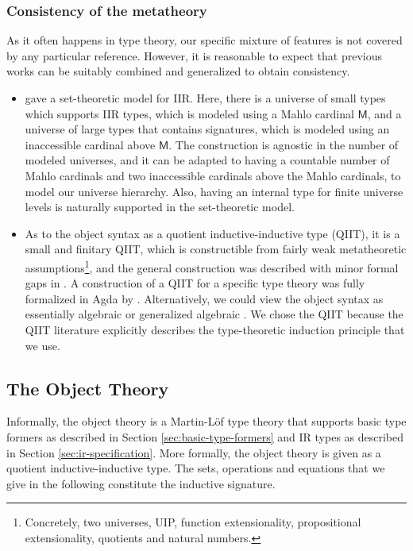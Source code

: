\documentclass[acmsmall,screen,review,anonymous]{acmart}
\newcommand{\msf}[1]{{\mathsf{#1}}}
\begin{document}
\subsubsection{Consistency of the metatheory} As it often happens in type theory, our specific mixture
of features is not covered by any particular reference. However, it is reasonable to expect that
previous works can be suitably combined and generalized to obtain consistency.
\begin{itemize}
\item \citet{DBLP:journals/jlp/DybjerS06} gave a set-theoretic model for IIR. Here, there is a universe of
  small types which supports IIR types, which is modeled using a Mahlo cardinal $\msf{M}$, and a universe of
  large types that contains signatures, which is modeled using an inaccessible cardinal above
  $\msf{M}$. The construction is agnostic in the number of modeled universes, and it can be adapted to
  having a countable number of Mahlo cardinals and two inaccessible cardinals above the Mahlo
  cardinals, to model our universe hierarchy. Also, having an internal type for finite universe
  levels is naturally supported in the set-theoretic model.
\item As to the object syntax as a quotient inductive-inductive type (QIIT), it is a small and
  finitary QIIT, which is constructible from fairly weak metatheoretic
  assumptions\footnote{Concretely, two universes, UIP, function extensionality, propositional
  extensionality, quotients and natural numbers.}, and the general construction was described with
  minor formal gaps in \cite{DBLP:journals/corr/abs-2302-08837}. A construction of a QIIT for a
  specific type theory was fully formalized in Agda by \citet{initiality-agda}. Alternatively, we
  could view the object syntax as essentially algebraic \cite{partialhorn} or generalized algebraic
  \cite{cartmellthesis}. We chose the QIIT because the QIIT literature explicitly describes the
  type-theoretic induction principle that we use.
\end{itemize}

\subsection{The Object Theory}\label{sec:object-theory}

Informally, the object theory is a Martin-Löf type theory that supports basic type formers as
described in Section \ref{sec:basic-type-formers} and IR types as described in Section
\ref{sec:ir-specification}. More formally, the object theory is given as a quotient
inductive-inductive type. The sets, operations and equations that we give in the following
constitute the inductive signature.
\end{document}
